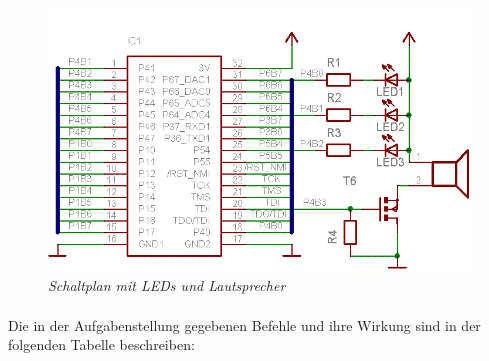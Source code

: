\begin{figure}
\centering
\includegraphics[width=\textwidth]{img/mikrocontrollerUNDled.png}
\caption{\em \small Schaltplan mit LEDs und Lautsprecher}
\end{figure}

\paragraph{} Die in der Aufgabenstellung gegebenen Befehle und 
ihre Wirkung sind in der folgenden Tabelle beschreiben:

